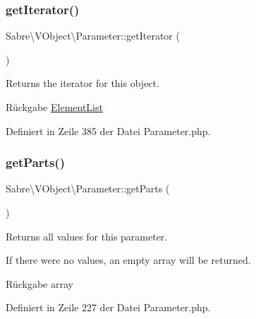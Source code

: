 \subsubsection{\texorpdfstring{get\+Iterator()}{getIterator()}}
{\footnotesize\ttfamily Sabre\textbackslash{}\+V\+Object\textbackslash{}\+Parameter\+::get\+Iterator (\begin{DoxyParamCaption}{ }\end{DoxyParamCaption})}

Returns the iterator for this object.

\begin{DoxyReturn}{Rückgabe}
\mbox{\hyperlink{class_sabre_1_1_v_object_1_1_element_list}{Element\+List}} 
\end{DoxyReturn}


Definiert in Zeile 385 der Datei Parameter.\+php.

\mbox{\label{class_sabre_1_1_v_object_1_1_parameter_a69b2cbaaf2e01e93b73f6670a455668e}} 
\subsubsection{\texorpdfstring{get\+Parts()}{getParts()}}
{\footnotesize\ttfamily Sabre\textbackslash{}\+V\+Object\textbackslash{}\+Parameter\+::get\+Parts (\begin{DoxyParamCaption}{ }\end{DoxyParamCaption})}

Returns all values for this parameter.

If there were no values, an empty array will be returned.

\begin{DoxyReturn}{Rückgabe}
array 
\end{DoxyReturn}


Definiert in Zeile 227 der Datei Parameter.\+php.

\mbox{\label{class_sabre_1_1_v_object_1_1_parameter_a5a810d3aa19c03ef6094a07dc4bb81a6}} 
